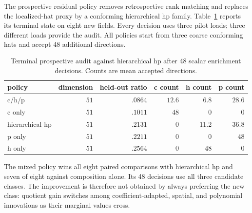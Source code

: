 \documentclass[11pt]{article}
\numberwithin{algorithm}{section}
\theoremstyle{definition}\newtheorem{definition}[theorem]{Definition}
\theoremstyle{remark}\newtheorem{remark}[theorem]{Remark}
\begin{document}
The prospective residual policy removes retrospective rank matching and
replaces the localized-hat proxy by a conforming hierarchical hp family.
Table~\ref{tab:darcy-residual-policy} reports its terminal state on eight new
fields.  Every decision uses three pilot loads; three different loads provide
the audit.  All policies start from three coarse conforming hats and accept 48
additional directions.
\begin{table}[H]
\centering
\caption{Terminal prospective audit against hierarchical hp after 48 scalar
enrichment decisions.  Counts are mean accepted directions.}
\label{tab:darcy-residual-policy}
\begin{tabular}{lrrrrr}
\toprule
policy & dimension & held-out ratio & c count & h count & p count\\
\midrule
c/h/p & $51$ & $.0864$ & $12.6$ & $6.8$ & $28.6$\\
c only & $51$ & $.1011$ & $48$ & $0$ & $0$\\
hierarchical hp & $51$ & $.2131$ & $0$ & $11.2$ & $36.8$\\
p only & $51$ & $.2211$ & $0$ & $0$ & $48$\\
h only & $51$ & $.2564$ & $0$ & $48$ & $0$\\
\bottomrule
\end{tabular}
\end{table}
The mixed policy wins all eight paired comparisons with hierarchical hp and
seven of eight against composition alone.  Its 48 decisions use all three
candidate classes.  The improvement is therefore not obtained by always
preferring the new class: quotient gain switches among coefficient-adapted,
spatial, and polynomial innovations as their marginal values cross.
\end{document}
